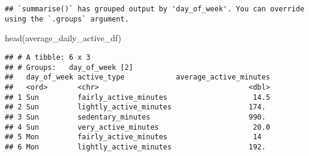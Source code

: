 \documentclass[
]{article}
\newenvironment{Shaded}{\begin{snugshade}}{\end{snugshade}}
\newcommand{\FunctionTok}[1]{\textcolor[rgb]{0.00,0.00,0.00}{#1}}
\newcommand{\NormalTok}[1]{#1}
\begin{document}
\begin{verbatim}
## `summarise()` has grouped output by 'day_of_week'. You can override using the `.groups` argument.
\end{verbatim}

\begin{Shaded}
\begin{Highlighting}[]
\FunctionTok{head}\NormalTok{(average\_daily\_active\_df)}
\end{Highlighting}
\end{Shaded}

\begin{verbatim}
## # A tibble: 6 x 3
## # Groups:   day_of_week [2]
##   day_of_week active_type            average_active_minutes
##   <ord>       <chr>                                   <dbl>
## 1 Sun         fairly_active_minutes                    14.5
## 2 Sun         lightly_active_minutes                  174. 
## 3 Sun         sedentary_minutes                       990. 
## 4 Sun         very_active_minutes                      20.0
## 5 Mon         fairly_active_minutes                    14  
## 6 Mon         lightly_active_minutes                  192.
\end{verbatim}
\end{document}
